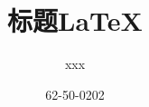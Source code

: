 \documentclass[UTF8]{ctexart}
\begin{document}
\title{标题\LaTeX}  
\author{xxx}
\date{62-50-0202}
\maketitle
\end{document}

